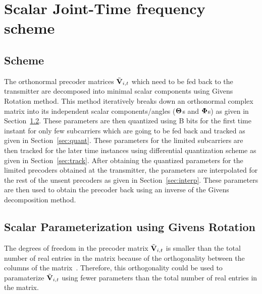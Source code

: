 \documentclass[11pt,a4paper]{report}
\def\bV{{\bf V}}
\begin{document}
\chapter{Scalar Joint-Time frequency scheme}
\label{chap:scheme}

\section{Scheme}
The orthonormal precoder matrices $\tilde{\bV}_{i,t}$ which need to be fed back
to the transmitter are decomposed into minimal scalar components using
Givens Rotation method. This method iteratively breaks down an orthonormal
complex matrix into its independent scalar components/angles
($\bf{\Theta}$s and $\bf{\Phi}$s) as given in Section~\ref{sec:param}. 
These parameters are then quantized using B bits for the first time instant 
for only few subcarriers which are going to be fed back and tracked as given 
in Section~\ref{sec:quant}. These parameters for the limited subcarriers are 
then tracked for the later time instances using differential quantization scheme
as given in Section~\ref{sec:track}. 
After obtaining the quantized parameters for the limited precoders obtained
at the transmitter, the parameters are interpolated for the rest of the unsent
precoders as given in Section~\ref{sec:interp}. These parameters are then used 
to obtain the precoder back using an inverse of the Givens decomposition method. 

\section{Scalar Parameterization using Givens Rotation}
\label{sec:param}
The degrees of freedom in the precoder matrix $\tilde{\bV}_{i,t}$ is
smaller than the total number of real entries in the matrix because of 
the orthogonality between the columns of the matrix~\cite{4114278}.
Therefore, this orthogonality could be used to paramaterize $\tilde{\bV}_{i,t}$ 
using fewer parameters than the total number of real entries in the matrix.
\end{document}
